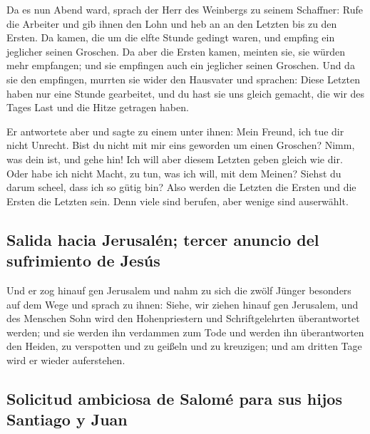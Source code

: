  Da es nun Abend ward, sprach der Herr des Weinbergs zu
seinem Schaffner: Rufe die Arbeiter und gib ihnen den Lohn und heb an an
den Letzten bis zu den Ersten.  Da kamen, die um die elfte
Stunde gedingt waren, und empfing ein jeglicher seinen Groschen.
 Da aber die Ersten kamen, meinten sie, sie würden mehr
empfangen; und sie empfingen auch ein jeglicher seinen Groschen.
 Und da sie den empfingen, murrten sie wider den
Hausvater  und sprachen: Diese Letzten haben nur eine
Stunde gearbeitet, und du hast sie uns gleich gemacht, die wir des Tages
Last und die Hitze getragen haben.

 Er antwortete aber und sagte zu einem unter ihnen: Mein
Freund, ich tue dir nicht Unrecht. Bist du nicht mit mir eins geworden
um einen Groschen?  Nimm, was dein ist, und gehe hin! Ich
will aber diesem Letzten geben gleich wie dir.  Oder habe
ich nicht Macht, zu tun, was ich will, mit dem Meinen? Siehst du darum
scheel, dass ich so gütig bin?  Also werden die Letzten
die Ersten und die Ersten die Letzten sein. Denn viele sind berufen,
aber wenige sind auserwählt.

\hypertarget{salida-hacia-jerusaluxe9n-tercer-anuncio-del-sufrimiento-de-jesuxfas}{%
\subsection{Salida hacia Jerusalén; tercer anuncio del sufrimiento de
Jesús}\label{salida-hacia-jerusaluxe9n-tercer-anuncio-del-sufrimiento-de-jesuxfas}}

 Und er zog hinauf gen Jerusalem und nahm zu sich die
zwölf Jünger besonders auf dem Wege und sprach zu ihnen: 
Siehe, wir ziehen hinauf gen Jerusalem, und des Menschen Sohn wird den
Hohenpriestern und Schriftgelehrten überantwortet werden; und sie werden
ihn verdammen zum Tode  und werden ihn überantworten den
Heiden, zu verspotten und zu geißeln und zu kreuzigen; und am dritten
Tage wird er wieder auferstehen.

\hypertarget{solicitud-ambiciosa-de-salomuxe9-para-sus-hijos-santiago-y-juan}{%
\subsection{Solicitud ambiciosa de Salomé para sus hijos Santiago y
Juan}\label{solicitud-ambiciosa-de-salomuxe9-para-sus-hijos-santiago-y-juan}}

